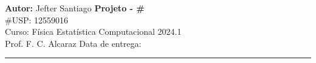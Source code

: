 \documentclass[a4paper, 11pt]{article}
\begin{document}
\noindent
\large\textbf{Autor:} Jefter Santiago \hfill \textbf{Projeto - \#}   \\
\#USP: 12559016 \\
\normalsize Curso: Física Estatística Computacional \hfill 2024.1 \\
Prof. F. C. Alcaraz \hfill Data de entrega: \\
\noindent\rule{7in}{2.8pt}
\end{document}
